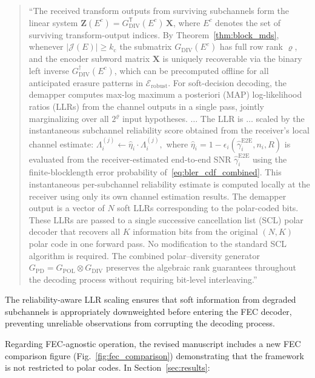 \begin{quote}
``The received transform outputs from surviving subchannels form the linear system $\mathbf{Z}(E^c) = G_{\mathrm{DIV}}^{\mathsf{T}}(E^c)\,\mathbf{X}$, where $E^c$ denotes the set of surviving transform-output indices. By Theorem~\ref{thm:block_mds}, whenever $|\mathcal{J}(E)| \geq k_{\mathrm{c}}$ the submatrix $G_{\mathrm{DIV}}(E^c)$ has full row rank $\varrho$, and the encoder subword matrix $\mathbf{X}$ is uniquely recoverable via the binary left inverse $G_{\mathrm{DIV}}^{\dagger}(E^c)$, which can be precomputed offline for all anticipated erasure patterns in $\mathcal{E}_{\mathrm{robust}}$. For soft-decision decoding, the demapper computes max-log maximum a posteriori (MAP) log-likelihood ratios (LLRs) from the channel outputs in a single pass, jointly marginalizing over all $2^{\varrho}$ input hypotheses. $\ldots$ The LLR is $\ldots$ scaled by the instantaneous subchannel reliability score obtained from the receiver's local channel estimate:
$\Lambda_i^{(j)} \leftarrow \hat{\eta}_i \cdot \Lambda_i^{(j)},$
where $\hat{\eta}_i = 1 - \epsilon_i(\hat{\gamma}_i^{\mathrm{E2E}}, n_i, R)$ is evaluated from the receiver-estimated end-to-end SNR $\hat{\gamma}_i^{\mathrm{E2E}}$ using the finite-blocklength error probability of~\eqref{eq:bler_cdf_combined}. This instantaneous per-subchannel reliability estimate is computed locally at the receiver using only its own channel estimation results. {\color{blue}The demapper output is a vector of $N$ soft LLRs corresponding to the polar-coded bits. These LLRs are passed to a single successive cancellation list (SCL) polar decoder that recovers all $K$ information bits from the original $(N,K)$ polar code in one forward pass. No modification to the standard SCL algorithm is required.} The combined polar--diversity generator $G_{\mathrm{PD}} = G_{\mathrm{POL}} \otimes G_{\mathrm{DIV}}$ preserves the algebraic rank guarantees throughout the decoding process without requiring bit-level interleaving.''
\end{quote}

The reliability-aware LLR scaling ensures that soft information from degraded subchannels is appropriately downweighted before entering the FEC decoder, preventing unreliable observations from corrupting the decoding process.

Regarding FEC-agnostic operation, the revised manuscript includes a new FEC comparison figure (Fig.~\ref{fig:fec_comparison}) demonstrating that the framework is not restricted to polar codes. In Section~\ref{sec:results}:

